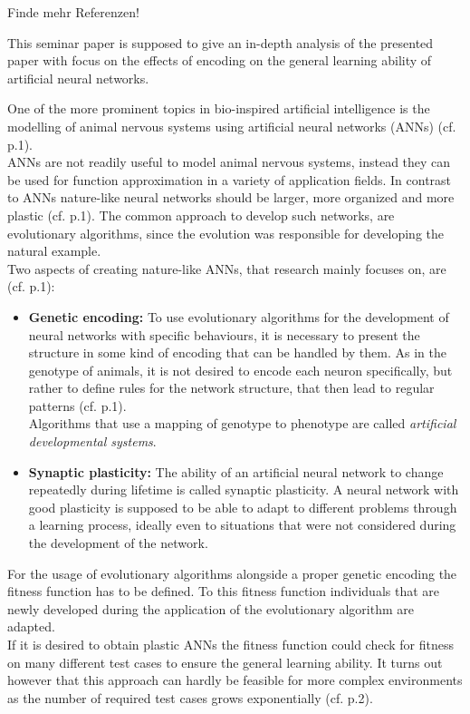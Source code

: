 \documentclass[12pt,twoside]{article}
\theoremstyle{plain}
\theoremstyle{definition}
\theoremstyle{remark}
\begin{document}
Finde mehr Referenzen!

This seminar paper is supposed to give an in-depth analysis of the presented paper \cite{citeulike:12788284} with focus on the effects of encoding on the general learning ability of artificial neural networks.\medskip

One of the more prominent topics in bio-inspired artificial intelligence is the modelling of animal nervous systems using artificial neural networks (ANNs) (cf. \cite{citeulike:12788284} p.1).\\
ANNs are not readily useful to model animal nervous systems, instead they can be used for function approximation in a variety of application fields.
In contrast to ANNs nature-like neural networks should be larger, more organized and more plastic (cf. \cite{citeulike:12788284} p.1). 
The common approach to develop such networks, are evolutionary algorithms, since the evolution was responsible for developing the natural example.\\
Two aspects of creating nature-like ANNs, that research mainly focuses on, are (cf. \cite{citeulike:12788284} p.1):
\begin{itemize}
	\item \textbf{Genetic encoding:} To use evolutionary algorithms for the development of neural networks with specific behaviours, it is necessary to present the structure in some kind of encoding that can be handled by them.
	As in the genotype of animals, it is not desired to encode each neuron specifically, but rather to define rules for the network structure, that then lead to regular patterns (cf. \cite{citeulike:12788284} p.1).\\
	Algorithms that use a mapping of genotype to phenotype are called \textit{artificial developmental systems}.
	\item \textbf{Synaptic plasticity:} The ability of an artificial neural network to change repeatedly during lifetime is called synaptic plasticity.
	A neural network with good plasticity is supposed to be able to adapt to different problems through a learning process, ideally even to situations that were not considered during the development of the network.
\end{itemize}
For the usage of evolutionary algorithms alongside a proper genetic encoding the fitness function has to be defined. To this fitness function individuals that are newly developed during the application of the evolutionary algorithm are adapted.\\
If it is desired to obtain plastic ANNs the fitness function could check for fitness on many different test cases to ensure the general learning ability.
It turns out however that this approach can hardly be feasible for more complex environments as the number of required test cases grows exponentially (cf. \cite{citeulike:12788284} p.2).\medskip
\end{document}
